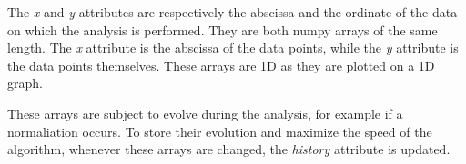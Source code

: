 The \textit{x} and \textit{y} attributes are respectively the abscissa and the ordinate of the data on which the analysis is performed. They are both numpy arrays of the same length. The \textit{x} attribute is the abscissa of the data points, while the \textit{y} attribute is the data points themselves. These arrays are 1D as they are plotted on a 1D graph. 

These arrays are subject to evolve during the analysis, for example if a normaliation occurs. To store their evolution and maximize the speed of the algorithm, whenever these arrays are changed, the \textit{history} attribute is updated. 